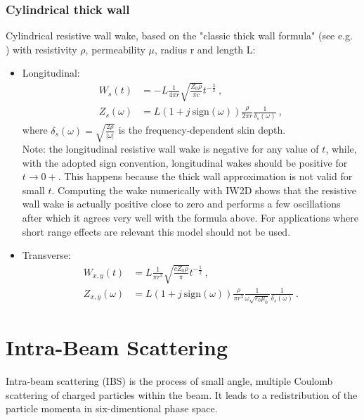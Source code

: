 \subsection*{Cylindrical thick wall}
Cylindrical resistive wall wake, based on the "classic thick wall formula" (see e.g. \cite[Chapter 2]{Chao:CollectiveInst}) with resistivity $\rho$, permeability $\mu$, radius r and length L:
\begin{itemize}
    \item Longitudinal:
    \begin{align}
        W_{s}(t) &= -L \frac{1}{4\pi r}
                    \sqrt{\frac{Z_0 \rho}{\pi c}}
                    t^{-\frac{3}{2}}~,\\
        Z_{s}(\omega) &= L \left(1 + j~\text{sign}(\omega) \right) \frac{\rho}{2\pi r} \frac{1}{\delta_s(\omega)}~,
    \end{align}
    where $\delta_s(\omega) = \sqrt{\frac{2 \rho}{|\omega|}}$ is the frequency-dependent skin depth.\\
    Note: the longitudinal resistive wall wake is negative for any value of $t$, while, with the adopted sign convention, longitudinal wakes should be positive for $t \rightarrow 0+$. This happens because the thick wall approximation is not valid for small $t$. Computing the wake numerically with IW2D shows that the resistive wall wake is actually positive close to zero and performs a few oscillations after which it agrees very well with the formula above. For applications where short range effects are relevant this model should not be used.
    \item Transverse:
    \begin{align}
        W_{x,y}(t) &= L \frac{1}{\pi r^3} \sqrt{\frac{c Z_0 \rho}{\pi}} t^{-\frac{1}{2}} ~,\\
        Z_{x,y}(\omega) &= L (1+j~\text{sign}(\omega))
                    \frac{\rho}{\pi r^3} \frac{1}{\omega \sqrt{\varepsilon_0 \mu_0}}
                    \frac{1}{\delta_s(\omega)}~.
    \end{align}    
\end{itemize}


\chapter{Intra-Beam Scattering}

Intra-beam scattering (IBS) is the process of small angle, multiple Coulomb scattering of charged particles within the beam.
It leads to a redistribution of the particle momenta in six-dimentional phase space.

